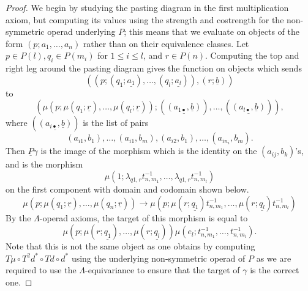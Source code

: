 \documentclass{amsbook} %
\newcommand{\un}{\underline}
\numberwithin{section}{chapter}
\begin{document}
\begin{proof}
We begin by studying the pasting diagram in the first multiplication axiom, but computing its values using the strength and costrength for the non-symmetric operad underlying $P$; this means that we evaluate on objects of the form $(p; a_{1}, \ldots, a_{n})$ rather than on their equivalence classes.  Let $p \in P(l), q_{i} \in P(m_{i})$ for $1 \leq i \leq l$, and $r \in P(n)$. Computing the top and right leg around the pasting diagram gives the function on objects which sends
  \[
    \left( (p; (q_{1}; \un{a_{1}}), \ldots, (q_{l}; \un{a_{l}})), (r; \un{b}) \right)
  \]
to
  \[
    \left( \mu(p; \mu(q_{1}; \un{r}), \ldots, \mu(q_{l}; \un{r})); (\un{(a_{1\bullet}, \un{b})}), \ldots, (\un{(a_{l\bullet}, \un{b})}) \right),
  \]
where $(\un{(a_{i\bullet}, \un{b})})$ is the list of pairs
  \[
    (a_{i1}, b_{1}), \ldots, (a_{i1}, b_{m}), (a_{i2}, b_{1}), \ldots, (a_{in_{i}}, b_{m}).
  \]
Then $\un{P}\gamma$ is the image of the morphism which is the identity on the $(a_{ij}, b_{k})$'s, and is the morphism
  \[
    \mu\left(1;\lambda_{q1,r}t^{-1}_{n,m_1},\ldots,\lambda_{q1,r}t^{-1}_{n,m_l}\right)
  \]
on the first component with domain and codomain shown below.
  \[
    \mu\left(p;\mu\left(q_1;\un{r}\right),\ldots,\mu\left(q_n;\un{r}\right)\right) \longrightarrow \mu\left(p;\mu\left(r;\un{q_1}\right)t^{-1}_{n,m_1},\ldots,\mu\left(r;\un{q_l}\right)t^{-1}_{n,m_l}\right)
  \]
By the $\Lambda$-operad axioms, the target of this morphism is equal to
  \[
    \mu\left(p; \mu\left(r; \un{q_{1}}\right), \ldots, \mu\left(r; \un{q_{l}}\right) \right)\mu\left(e_{l}; t^{-1}_{n,m_{1}}, \ldots, t^{-1}_{n,m_{l}}\right).
  \]
Note that this is not the same object as one obtains by computing $T\mu \circ T^{2}d^{*} \circ Td \circ d^{*}$ using the underlying non-symmetric operad of $P$ as we are required to use the $\Lambda$-equivariance to ensure that the target of $\gamma$ is the correct one.


\end{proof}
\end{document}
